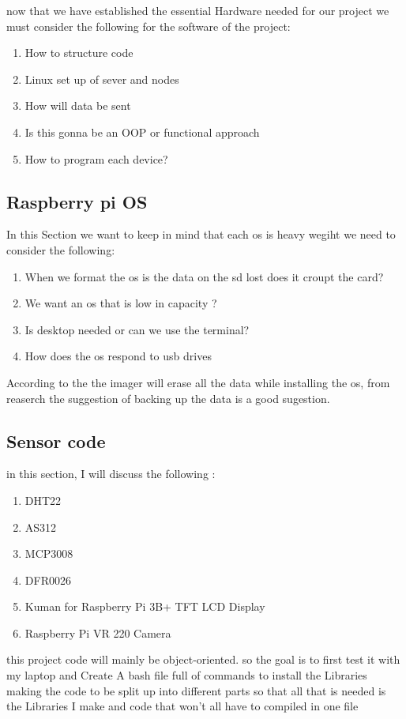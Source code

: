 
	now that we have established the  essential Hardware needed for our project we must consider the following  for the software of the  project:
	\begin{enumerate}
	    \item How to structure code 
	    \item Linux set up of sever and nodes
	    \item How will data be sent
	    \item Is this gonna be an OOP or functional  approach
	    \item How to program each device?
	\end{enumerate}
	\subsection{Raspberry pi OS}
	\label{pi os}
	In this Section  we want to keep in mind  that each os is  heavy wegiht  we need to consider the following:
	\begin{enumerate}
		\item When we  format the os is the  data on the sd lost does it croupt the  card?
		\item We want an os that is low in capacity ?
		\item Is desktop needed or can we  use  the  terminal?
		\item How does  the os  respond to usb drives
	\end{enumerate}
	According to the \cite{projects} the imager will erase all the data while installing the os, from reaserch  the suggestion of backing up the data is  a  good sugestion.
	
	\subsection{Sensor code}
	in this section, I will discuss the following :
	\begin{enumerate}
		\item DHT22
		\item AS312
		\item MCP3008
		\item DFR0026
		\item Kuman for Raspberry Pi 3B+ TFT LCD Display
		\item Raspberry Pi VR 220 Camera 
	\end{enumerate}
	this project code will mainly be object-oriented. so the goal is to first test it with my laptop and  Create A bash file  full of  commands to install  the Libraries
	making the code to be split up  into  different parts so that all that is needed is the Libraries I make and code that won't all have to  compiled in one file

